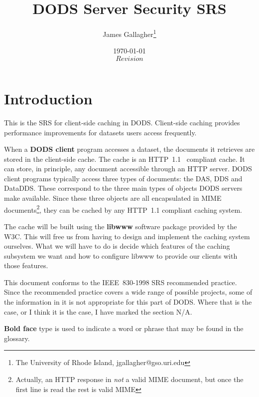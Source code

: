 \documentclass{article}
\begin{document}
\title{DODS Server Security SRS}
\author{James Gallagher\thanks{The University of Rhode Island,
    jgallagher@gso.uri.edu}}
\date{\today \\ $Revision$ }



\maketitle
\tableofcontents

\section{Introduction}

This is the \ac{SRS} for client-side caching in \acs{DODS}. Client-side
caching provides performance improvements for datasets users access
frequently.

When a \textbf{DODS client} program accesses a
dataset, the documents it retrieves are stored in the client-side cache. The
cache is an \acs{HTTP}~1.1~\cite{w3c:http} compliant cache. It can store, in
principle, any document accessible through an HTTP server. DODS client
programs typically access three types of documents: the \acs{DAS}, \acs{DDS}
and \acs{DataDDS}. These correspond to the three main types of objects DODS
servers make available. Since these three objects are all encapsulated in
\acs{MIME}~\cite{rfc:mime} documents\footnote{Actually, an HTTP response in
  \emph{not} a valid MIME document, but once the first line is read the rest
  is valid MIME}, they can be cached by any HTTP~1.1 compliant caching
system.
  
The cache will be built using the \textbf{libwww} software
package provided by the \ac{W3C}. This will free us from having to design and
implement the caching system ourselves. What we will have to do is decide
which features of the caching subsystem we want and how to configure libwww
to provide our clients with those features.

This document conforms to the IEEE~830-1998 \ac{SRS} recommended practice.
Since the recommended practice covers a wide range of possible projects, some
of the information in it is not appropriate for this part of \acs{DODS}.
Where that is the case, or I think it is the case, I have marked the section
N/A.

\textbf{Bold face} type is used to indicate a word or phrase that may be
found in the glossary.
\end{document}
